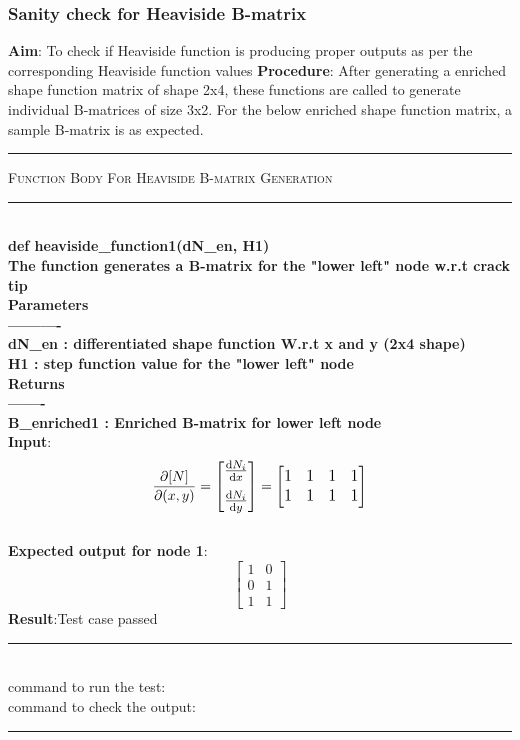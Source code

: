 \documentclass[fleqn, 12.5pt,a4paper]{report}
\begin{document}
\subsubsection{Sanity check for Heaviside B-matrix}
\textbf{Aim}: To check if Heaviside function is producing proper outputs as per the corresponding Heaviside function values \newline
\textbf{Procedure}: After generating a enriched shape function matrix of shape 2x4, these functions are called to generate individual B-matrices of size 3x2.
For the below enriched shape function matrix, a sample B-matrix is as expected.
\\
{\rule{\linewidth}{0.05cm}}
	{\scshape Function Body For Heaviside B-matrix Generation}\\
{\rule{\linewidth}{0.05cm}}
{\selectfont
\\
\textbf{def heaviside{\_}function1(dN{\_}en, H1)\\
    The function generates a B-matrix for the "lower left" node w.r.t crack tip\\
    Parameters\\
    ----------\\
    dN{\_}en : differentiated shape function W.r.t x and y (2x4 shape)\\
    H1 : step function value for the "lower left" node\\
    Returns\\
    -------\\
    B{\_}enriched1 : Enriched B-matrix for lower left node\\
}}
\textbf{Input}: 
$$
    \pdv{[N]}{(x,y)} = \large \begin{bmatrix} 
    \dv{N_i} {x} \\[7pt]
    \dv{N_i} {y} \\
    \end{bmatrix} \large
    =
    \begin{bmatrix}
    1 & 1 & 1 & 1 \\
    1 & 1 & 1 & 1 \\
    \end{bmatrix}
    $$
\\                
\textbf{Expected output for node 1}:
$$
\left[\begin{array}{ll}
1 & 0 \\
0 & 1 \\
1 & 1
\end{array}\right]
$$
\textbf{Result}:Test case passed
\\
{\rule{\linewidth}{0.02cm}}\\
command to run the test: {\selectfont {}}\\
command to check the output: {\selectfont {}}\\
{ \rule{\linewidth}{0.02cm}}
\end{document}

